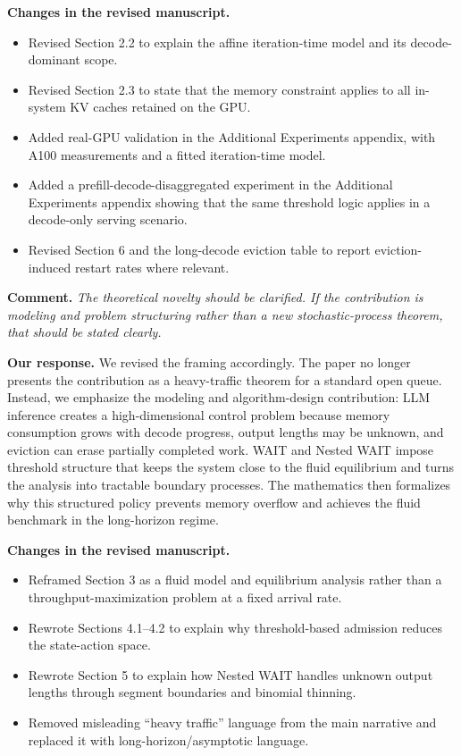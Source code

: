 \documentclass[11pt]{article}
\newcommand{\comment}[1]{%
  \vspace{0.25em}
  \noindent\textbf{Comment.} \emph{#1}
}
\newcommand{\response}{\vspace{0.25em}\noindent\textbf{Our response.} }
\newcommand{\changes}{\vspace{0.25em}\noindent\textbf{Changes in the revised manuscript.} }
\begin{document}
\changes
\begin{itemize}
    \item Revised Section 2.2 to explain the affine iteration-time model and its decode-dominant scope.
    \item Revised Section 2.3 to state that the memory constraint applies to all in-system KV caches retained on the GPU.
    \item Added real-GPU validation in the Additional Experiments appendix, with A100 measurements and a fitted iteration-time model.
    \item Added a prefill-decode-disaggregated experiment in the Additional Experiments appendix showing that the same threshold logic applies in a decode-only serving scenario.
    \item Revised Section 6 and the long-decode eviction table to report eviction-induced restart rates where relevant.
\end{itemize}

\comment{The theoretical novelty should be clarified. If the contribution is modeling and problem structuring rather than a new stochastic-process theorem, that should be stated clearly.}

\response We revised the framing accordingly. The paper no longer presents the contribution as a heavy-traffic theorem for a standard open queue. Instead, we emphasize the modeling and algorithm-design contribution: LLM inference creates a high-dimensional control problem because memory consumption grows with decode progress, output lengths may be unknown, and eviction can erase partially completed work. WAIT and Nested WAIT impose threshold structure that keeps the system close to the fluid equilibrium and turns the analysis into tractable boundary processes. The mathematics then formalizes why this structured policy prevents memory overflow and achieves the fluid benchmark in the long-horizon regime.

\changes
\begin{itemize}
    \item Reframed Section 3 as a fluid model and equilibrium analysis rather than a throughput-maximization problem at a fixed arrival rate.
    \item Rewrote Sections 4.1--4.2 to explain why threshold-based admission reduces the state-action space.
    \item Rewrote Section 5 to explain how Nested WAIT handles unknown output lengths through segment boundaries and binomial thinning.
    \item Removed misleading ``heavy traffic'' language from the main narrative and replaced it with long-horizon/asymptotic language.
\end{itemize}
\end{document}
